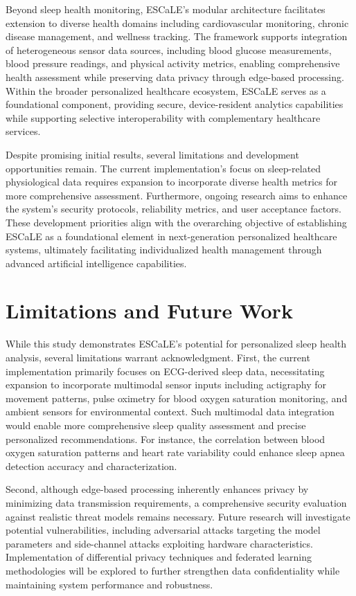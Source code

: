 \documentclass[preprint,12pt]{elsarticle}
\begin{document}
Beyond sleep health monitoring, ESCaLE's modular architecture facilitates extension to diverse health domains including cardiovascular monitoring, chronic disease management, and wellness tracking. The framework supports integration of heterogeneous sensor data sources, including blood glucose measurements, blood pressure readings, and physical activity metrics, enabling comprehensive health assessment while preserving data privacy through edge-based processing. Within the broader personalized healthcare ecosystem, ESCaLE serves as a foundational component, providing secure, device-resident analytics capabilities while supporting selective interoperability with complementary healthcare services.

Despite promising initial results, several limitations and development opportunities remain. The current implementation's focus on sleep-related physiological data requires expansion to incorporate diverse health metrics for more comprehensive assessment. Furthermore, ongoing research aims to enhance the system's security protocols, reliability metrics, and user acceptance factors. These development priorities align with the overarching objective of establishing ESCaLE as a foundational element in next-generation personalized healthcare systems, ultimately facilitating individualized health management through advanced artificial intelligence capabilities.

\section{Limitations and Future Work}
While this study demonstrates ESCaLE's potential for personalized sleep health analysis, several limitations warrant acknowledgment. First, the current implementation primarily focuses on ECG-derived sleep data, necessitating expansion to incorporate multimodal sensor inputs including actigraphy for movement patterns, pulse oximetry for blood oxygen saturation monitoring, and ambient sensors for environmental context. Such multimodal data integration would enable more comprehensive sleep quality assessment and precise personalized recommendations. For instance, the correlation between blood oxygen saturation patterns and heart rate variability could enhance sleep apnea detection accuracy and characterization.

Second, although edge-based processing inherently enhances privacy by minimizing data transmission requirements, a comprehensive security evaluation against realistic threat models remains necessary. Future research will investigate potential vulnerabilities, including adversarial attacks targeting the model parameters and side-channel attacks exploiting hardware characteristics. Implementation of differential privacy techniques and federated learning methodologies will be explored to further strengthen data confidentiality while maintaining system performance and robustness.
\end{document}
